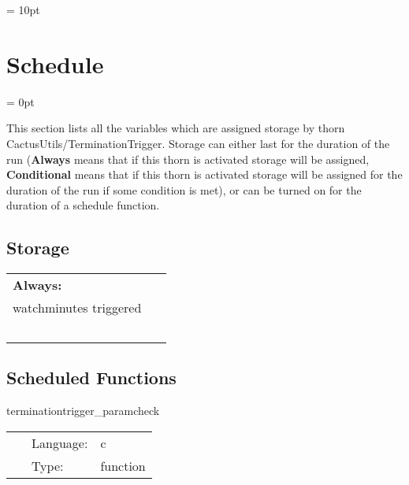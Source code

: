 \vspace{5mm}\parskip = 10pt 

\section{Schedule} 


\parskip = 0pt


\noindent This section lists all the variables which are assigned storage by thorn CactusUtils/TerminationTrigger.  Storage can either last for the duration of the run ({\bf Always} means that if this thorn is activated storage will be assigned, {\bf Conditional} means that if this thorn is activated storage will be assigned for the duration of the run if some condition is met), or can be turned on for the duration of a schedule function.


\subsection*{Storage}

\hspace{5mm}

 \begin{tabular*}{160mm}{ll} 

{\bf Always:}&  ~ \\ 
 watchminutes triggered & ~\\ 
~ & ~\\ 
\end{tabular*} 


\subsection*{Scheduled Functions}
\vspace{5mm}


\hspace{5mm} terminationtrigger\_paramcheck 

\hspace{5mm}{\it check consitency of parameters } 


\hspace{5mm}

 \begin{tabular*}{160mm}{cll} 
~ & Language:  & c \\ 
~ & Type:  & function \\ 
\end{tabular*} 


\vspace{5mm}

